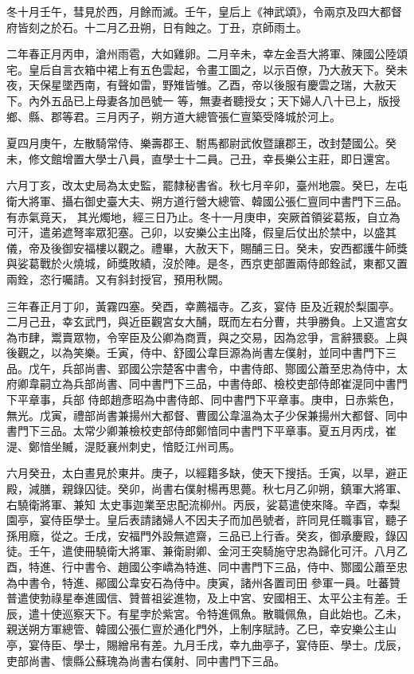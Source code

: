 \begin{pinyinscope}
 冬十月壬午，彗見於西，月餘而滅。壬午，皇后上《神武頌》，令兩京及四大都督府皆刻之於石。十二月乙丑朔，日有蝕之。丁丑，京師雨土。



 二年春正月丙申，滄州雨雹，大如雞卵。二月辛未，幸左金吾大將軍、陳國公陸頌宅。皇后自言衣箱中裙上有五色雲起，令畫工圖之，以示百僚，乃大赦天下。癸未夜，天保星墜西南，有聲如雷，野雉皆雊。乙酉，帝以後服有慶雲之瑞，大赦天下。內外五品已上母妻各加邑號一
 等，無妻者聽授女；天下婦人八十已上，版授鄉、縣、郡等君。三月丙子，朔方道大總管張仁亶築受降城於河上。



 夏四月庚午，左散騎常侍、樂壽郡王、駙馬都尉武攸暨讓郡王，改封楚國公。癸未，修文館增置大學士八員，直學士十二員。己丑，幸長樂公主莊，即日還宮。



 六月丁亥，改太史局為太史監，罷隸秘書省。秋七月辛卯，臺州地震。癸巳，左屯衛大將軍、攝右御史臺大夫、朔方道行營大總管、韓國公張仁亶同中書門下三品。有赤氣竟天，
 其光燭地，經三日乃止。冬十一月庚申，突厥首領娑葛叛，自立為可汗，遣弟遮弩率眾犯塞。己卯，以安樂公主出降，假皇后仗出於禁中，以盛其儀，帝及後御安福樓以觀之。禮畢，大赦天下，賜酺三日。癸未，安西都護牛師獎與娑葛戰於火燒城，師獎敗績，沒於陣。是冬，西京吏部置兩侍郎銓試，東都又置兩銓，恣行囑請。又有斜封授官，預用秋闕。



 三年春正月丁卯，黃霧四塞。癸酉，幸薦福寺。乙亥，宴侍
 臣及近親於梨園亭。二月己丑，幸玄武門，與近臣觀宮女大酺，既而左右分曹，共爭勝負。上又遣宮女為市肆，鬻賣眾物，令宰臣及公卿為商賈，與之交易，因為忿爭，言辭猥褻。上與後觀之，以為笑樂。壬寅，侍中、舒國公韋巨源為尚書左僕射，並同中書門下三品。戊午，兵部尚書、郢國公宗楚客中書令，中書侍郎、酂國公蕭至忠為侍中，太府卿韋嗣立為兵部尚書、同中書門下三品，中書侍郎、檢校吏部侍郎崔湜同中書門下平章事，兵部
 侍郎趙彥昭為中書侍郎、同中書門下平章事。庚申，日赤紫色，無光。戊寅，禮部尚書兼揚州大都督、曹國公韋溫為太子少保兼揚州大都督、同中書門下三品。太常少卿兼檢校吏部侍郎鄭愔同中書門下平章事。夏五月丙戌，崔湜、鄭愔坐贓，湜貶襄州刺史，愔貶江州司馬。



 六月癸丑，太白晝見於東井。庚子，以經籍多缺，使天下搜括。壬寅，以旱，避正殿，減膳，親錄囚徒。癸卯，尚書右僕射楊再思薨。秋七月乙卯朔，鎮軍大將軍、右驍衛將軍、兼知
 太史事迦業至忠配流柳州。丙辰，娑葛遣使來降。辛酉，幸梨園亭，宴侍臣學士。皇后表請諸婦人不因夫子而加邑號者，許同見任職事官，聽子孫用廕，從之。壬戌，安福門外設無遮齋，三品已上行香。癸亥，御承慶殿，錄囚徒。壬午，遣使冊驍衛大將軍、兼衛尉卿、金河王突騎施守忠為歸化可汗。八月乙酉，特進、行中書令、趙國公李嶠為特進、同中書門下三品，侍中、酂國公蕭至忠為中書令，特進、鄖國公韋安石為侍中。庚寅，諸州各置司田
 參軍一員。吐蕃贊普遣使勃祿星奉進國信、贊普祖娑進物，及上中宮、安國相王、太平公主有差。壬辰，遣十使巡察天下。有星孛於紫宮。令特進佩魚。散職佩魚，自此始也。乙未，親送朔方軍總管、韓國公張仁亶於通化門外，上制序賦詩。乙巳，幸安樂公主山亭，宴侍臣、學士，賜繒帛有差。九月壬戌，幸九曲亭子，宴侍臣、學士。戊辰，吏部尚書、懷縣公蘇瑰為尚書右僕射、同中書門下三品。




\end{pinyinscope}
